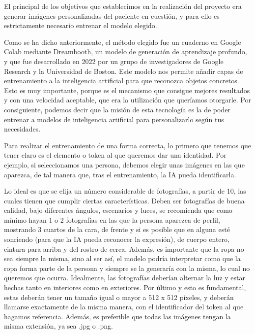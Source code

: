 El principal de los objetivos que establecimos en la realización del proyecto era generar imágenes personalizadas del paciente en cuestión, y para ello es estrictamente necesario entrenar el modelo elegido.

Como se ha dicho anteriormente, el método elegido fue un cuaderno en Google Colab mediante Dreambooth,  un modelo de generación de aprendizaje profundo, y que fue desarrollado en 2022 por un grupo de investigadores de Google Research y la Universidad de Boston.  Este modelo nos permite añadir capas de entrenamiento a la inteligencia artificial para que reconozca objetos concretos. Esto es muy importante, porque es el mecanismo que consigue mejores resultados y con una velocidad aceptable, que era la utilización que queríamos otorgarle. Por consiguiente, podemos decir que la misión de esta tecnología es la de poder entrenar a modelos de inteligencia artificial para personalizarlo según tus necesidades.

Para realizar el entrenamiento de una forma correcta, lo primero que tenemos que tener claro es  el elemento o token al que queremos dar una identidad. Por ejemplo, si seleccionamos una persona, debemos elegir unas imágenes en las que aparezca, de tal manera que, tras el entrenamiento, la IA pueda identificarla. 

Lo ideal es que se elija un número considerable de fotografías, a partir de 10, las cuales tienen que cumplir ciertas características. Deben ser fotografías de buena calidad, bajo diferentes ángulos, escenarios y luces, se recomienda que como mínimo hayan 1 o 2 fotografías en las que la persona aparezca de perfil, mostrando 3 cuartos de la cara, de frente y si es posible que en alguna esté sonriendo (para que la IA pueda reconocer la expresión), de cuerpo entero, cintura para arriba y del rostro de cerca. Además, es importante que la ropa no sea siempre la misma, sino al ser así, el modelo podría interpretar como que la ropa forma parte de la persona y siempre se la generaría con la misma, lo cual no queremos que ocurra. Idealmente, las fotografías deberían alternar la luz y estar hechas tanto en interiores como en exteriores. Por último y esto es fundamental, estas deberán tener un tamaño igual o mayor a 512 x 512 píxeles, y deberán llamarse exactamente de la misma manera, con el identificador del token al que hagamos referencia. Además, es preferible que todas las imágenes tengan la misma extensión, ya sea .jpg o .png. 


